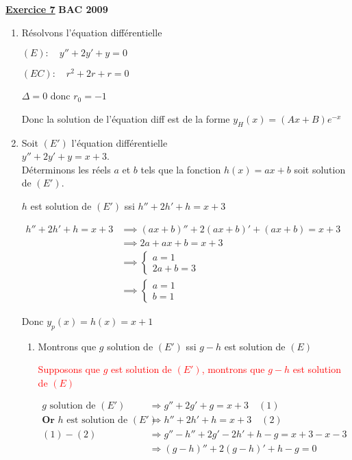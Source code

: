 \documentclass[12pt,a4paper]{article}
\newcommand{\exo}[1]{%
        \textbf{\underline{Exercice #1}}
}
\begin{document}
\exo{7} \textbf{BAC 2009}

\begin{enumerate}
    \item Résolvons l’équation différentielle
    
    \( (E) :\quad y'' + 2y' + y = 0 \)
    
    \( (EC) :\quad r^{2} + 2r + r = 0 \)
    
    \( \Delta = 0 \) donc \( r_{0} =-1 \)
    
    Donc la solution de l'équation diff est de la forme \( y_{H}(x) = (Ax+B)e^{-x} \)
    
    \item Soit \( (E') \) l’équation différentielle\\ \( y'' + 2y' + y = x + 3 \).\\
    Déterminons les réels \( a \) et \( b \) tels que la fonction \( h(x) = ax + b \) soit solution de \( (E') \).
    
    \( h \) est solution de \( (E') \) ssi  \( h'' + 2h' + h = x + 3 \)
    
		\( 
		    \begin{aligned}
    			 h'' + 2h' + h = x + 3 & \implies (ax + b)'' + 2 (ax + b)' + (ax + b) = x + 3\\
    			 											& \implies 2a  + ax + b = x + 3\\
    			 											& \implies \begin{cases}a=1\\ 2a+b=3 \end{cases}\\
    			 											& \implies \begin{cases}a=1\\ b=1 \end{cases}
    		\end{aligned}
		\)
		
		Donc \( y_{p}(x) = h(x) = x + 1 \)
    \begin{enumerate}
        \item Montrons que \( g \) solution de \((E')\) ssi \( g - h \) est solution de \((E)\)

        \textcolor{red}{\textasteriskcentered{} Supposons que \( g \) est solution de \((E') \), montrons que \( g - h \) est solution de \((E) \)}

\(        
\begin{aligned}
            g \text{ solution de } (E') &\Rightarrow g'' + 2g' + g = x + 3 \quad(1)\\
             \textbf{Or }h \text{ est solution de } (E')&\Rightarrow h'' + 2h' + h = x + 3 \quad(2)\\
(1) - (2)       &\Rightarrow g''-h''+2g'-2h'+h-g=x + 3-x - 3\\
                &\Rightarrow (g-h)''+2(g-h)'+h-g=0\\
\end{aligned}
\)


\end{enumerate}
\end{enumerate}
\end{document}
